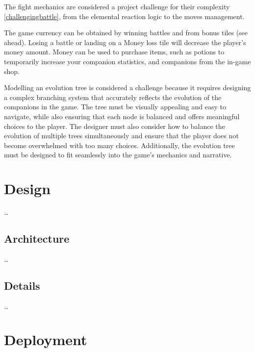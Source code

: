 \documentclass[12pt, a4paper]{report}
\begin{document}
    The fight mechanics are considered a project challenge for their complexity \ref{challengingbattle}, from the elemental reaction logic to the moves management.

    The game currency can be obtained by winning battles and from bonus tiles (see ahead).
    Losing a battle or landing on a Money loss tile will decrease the player's money amount.
    Money can be used to purchase items, such as potions to temporarily increase your companion statistics, and companions from the in-game shop.

    Modelling an evolution tree is considered a challenge because it requires designing a complex branching system that accurately reflects the evolution of the companions in the game. 
    The tree must be visually appealing and easy to navigate, while also ensuring that each node is balanced and offers meaningful choices to the player. 
    The designer must also consider how to balance the evolution of multiple trees simultaneously and ensure that the player does not become overwhelmed with too many choices. 
    Additionally, the evolution tree must be designed to fit seamlessly into the game's mechanics and narrative.


\chapter{Design}

    \dots

\section{Architecture}

    \dots

\section{Details}

    \dots

\chapter{Deployment}
\end{document}
